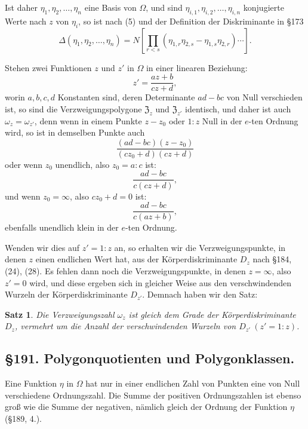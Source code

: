 \documentclass[12pt,a4paper]{article}
\newtheorem*{satz}{Satz}
\begin{document}
Ist daher $\eta_1, \eta_2, \ldots, \eta_n$ eine Basis von $\Omega$, und sind $\eta_{i,1}, \eta_{i,2}, \ldots, \eta_{i,n}$ konjugierte Werte nach $z$ von $\eta_i$, so ist nach (5) und der Definition der Diskriminante in \S 173
\begin{equation}\label{eq:190-6}
\Delta(\eta_1, \eta_2, \ldots, \eta_n) = N\left[\prod_{r<s}(\eta_{1,r}\eta_{2,s} - \eta_{1,s}\eta_{2,r})\cdots\right].
\end{equation}

Stehen zwei Funktionen $z$ und $z'$ in $\Omega$ in einer linearen Beziehung:
\begin{equation}\label{eq:190-7}
z' = \frac{az+b}{cz+d},
\end{equation}
worin $a, b, c, d$ Konstanten sind, deren Determinante $ad-bc$ von Null verschieden ist, so sind die Verzweigungspolygone $\mathfrak{Z}_z$ und $\mathfrak{Z}_{z'}$ identisch, und daher ist auch $\omega_z = \omega_{z'}$, denn wenn in einem Punkte $z-z_0$ oder $1:z$ Null in der $e$-ten Ordnung wird, so ist in demselben Punkte auch
\[
\frac{(ad-bc)(z-z_0)}{(cz_0+d)(cz+d)}
\]
oder wenn $z_0$ unendlich, also $z_0 = a:c$ ist:
\[
\frac{ad-bc}{c(cz+d)},
\]
und wenn $z_0 = \infty$, also $cz_0 + d = 0$ ist:
\[
\frac{ad-bc}{c(az+b)},
\]
ebenfalls unendlich klein in der $e$-ten Ordnung.

Wenden wir dies auf $z' = 1:z$ an, so erhalten wir die Verzweigungspunkte, in denen $z$ einen endlichen Wert hat, aus der Körperdiskriminante $D_z$ nach \S 184, (24), (28). Es fehlen dann noch die Verzweigungspunkte, in denen $z = \infty$, also $z' = 0$ wird, und diese ergeben sich in gleicher Weise aus den verschwindenden Wurzeln der Körperdiskriminante $D_{z'}$. Demnach haben wir den Satz:

\begin{satz}
Die Verzweigungszahl $\omega_z$ ist gleich dem Grade der Körperdiskriminante $D_z$, vermehrt um die Anzahl der verschwindenden Wurzeln von $D_{z'}\ (z' = 1:z)$.
\end{satz}

\subsection*{\S 191. Polygonquotienten und Polygonklassen.}

Eine Funktion $\eta$ in $\Omega$ hat nur in einer endlichen Zahl von Punkten eine von Null verschiedene Ordnungszahl. Die Summe der positiven Ordnungszahlen ist ebenso groß wie die Summe der negativen, nämlich gleich der Ordnung der Funktion $\eta$ (\S 189, 4.).
\end{document}
